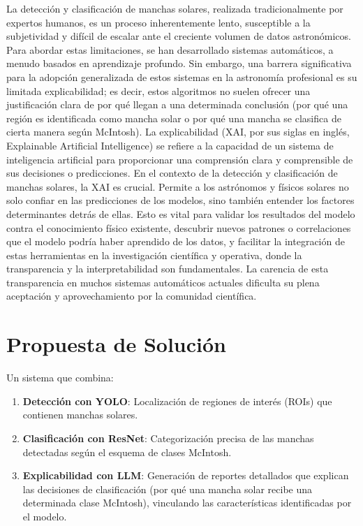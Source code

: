 \documentclass[conference]{IEEEtran}
\begin{document}
La detección y clasificación de manchas solares, realizada tradicionalmente por expertos humanos, es un proceso inherentemente lento, susceptible a la subjetividad y difícil de escalar ante el creciente volumen de datos astronómicos. Para abordar estas limitaciones, se han desarrollado sistemas automáticos, a menudo basados en aprendizaje profundo. Sin embargo, una barrera significativa para la adopción generalizada de estos sistemas en la astronomía profesional es su limitada explicabilidad; es decir, estos algoritmos no suelen ofrecer una justificación clara de por qué llegan a una determinada conclusión (por qué una región es identificada como mancha solar o por qué una mancha se clasifica de cierta manera según McIntosh).
La explicabilidad (XAI, por sus siglas en inglés, Explainable Artificial Intelligence) se refiere a la capacidad de un sistema de inteligencia artificial para proporcionar una comprensión clara y comprensible de sus decisiones o predicciones. En el contexto de la detección y clasificación de manchas solares, la XAI es crucial. Permite a los astrónomos y físicos solares no solo confiar en las predicciones de los modelos, sino también entender los factores determinantes detrás de ellas. Esto es vital para validar los resultados del modelo contra el conocimiento físico existente, descubrir nuevos patrones o correlaciones que el modelo podría haber aprendido de los datos, y facilitar la integración de estas herramientas en la investigación científica y operativa, donde la transparencia y la interpretabilidad son fundamentales. La carencia de esta transparencia en muchos sistemas automáticos actuales dificulta su plena aceptación y aprovechamiento por la comunidad científica.

\section*{Propuesta de Solución}

Un sistema que combina:
\begin{enumerate}
    \item \textbf{Detección con YOLO}: Localización de regiones de interés (ROIs) que contienen manchas solares.
    \item \textbf{Clasificación con ResNet}: Categorización precisa de las manchas detectadas según el esquema de clases McIntosh.
    \item \textbf{Explicabilidad con LLM}: Generación de reportes detallados que explican las decisiones de clasificación (por qué una mancha solar recibe una determinada clase McIntosh), vinculando las características identificadas por el modelo.
\end{enumerate}
\end{document}
